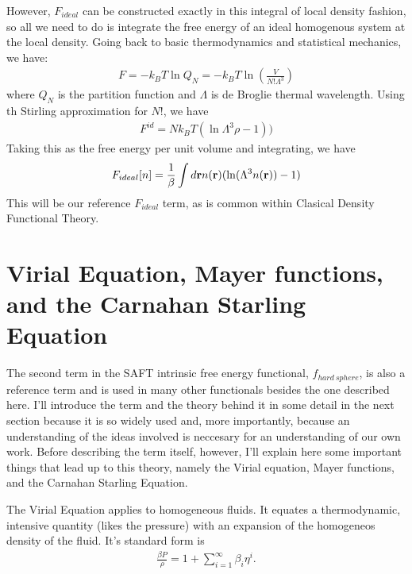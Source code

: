 However, $F_{ideal}$ can be constructed exactly in this integral of
local density fashion, so all we need to do is integrate the free
energy of an ideal homogenous system at the local density.  Going back
to basic thermodynamics and statistical mechanics, we have:
\begin{align}
  F = -k_BT \ln Q_N = -k_BT \ln (\frac{V}{N!\Lambda^3})
\end{align}
where $Q_N$ is the partition function and $\Lambda$ is de Broglie
thermal wavelength.  Using th Stirling approximation for $N!$, we have
\begin{align}
F^{id} = Nk_BT(\ln \Lambda^3 \rho - 1))
\end{align}
Taking this as the free energy per unit volume and integrating, we
have
\begin{align}
  F_{ideal}[n] = \frac{1}{\beta}\int d\textbf{r} n(\textbf{r})(\ln (\Lambda^3 n(\textbf{r}))-1)
\end{align}
This will be our reference $F_{ideal}$ term, as is common within
Clasical Density Functional Theory.

\clearpage
\newpage

\section{Virial Equation, Mayer functions, and the Carnahan Starling Equation}

The second term in the SAFT intrinsic free energy functional,
$f_{hard~sphere}$, is also a reference term and is used in many other
functionals besides the one described here.  I'll introduce the term
and the theory behind it in some detail in the next section because it
is so widely used and, more importantly, because an understanding of
the ideas involved is neccesary for an understanding of our own work.
Before describing the term itself, however, I'll explain here some
important things that lead up to this theory, namely the Virial
equation, Mayer functions, and the Carnahan Starling Equation.

The Virial Equation applies to homogeneous fluids.  It equates a
thermodynamic, intensive quantity (likes the pressure) with an
expansion of the homogeneos density of the fluid.  It's standard form
is
\begin{align}
  \frac{\beta P}{\rho} = 1 + \sum_{i=1}^{\infty}\beta_i\eta^i.
\end{align}

